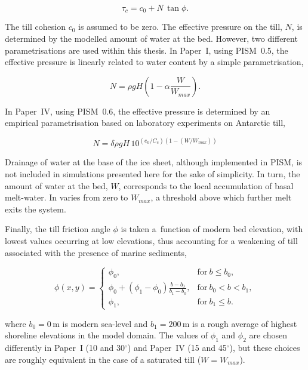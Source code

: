 \documentclass{article}
\begin{document}
\begin{equation}
   \tau_c = c_0 + N\,\tan{\phi}.
\end{equation}

The till cohesion $c_0$ is assumed to be zero. The effective pressure on the
till, $N$, is determined by the modelled amount of water at the bed. However,
two different parametrisations are used within this thesis. In Paper~I, using
PISM~0.5, the effective pressure is linearly related to water content by a
simple parametrisation,

\begin{equation}
    N = \rho gH (1 - \alpha \frac{W}{W_{max}}).
\end{equation}

In Paper~IV, using PISM~0.6, the effective pressure is determined by an
empirical parametrisation based on laboratory experiments on Antarctic till,

\begin{equation}
    N = \delta \rho gH \, 10^{(e_0/C_c) (1 - (W/W_{max}))}
\end{equation}

Drainage of water at the base of the ice sheet, although implemented in PISM,
is not included in simulations presented here for the sake of simplicity.
In turn, the amount of water at the bed, $W$, corresponds to the local
accumulation of basal melt-water. In varies from zero to $W_{max}$, a threshold
above which further melt exits the system.

Finally, the till friction angle $\phi$ is taken a~function of modern bed
elevation, with lowest values occurring at low elevations, thus accounting for
a weakening of till associated with the presence of marine sediments,

\begin{equation}
    \phi(x,y) =
    \begin{cases}
        \phi_0, & \mathrm{for}\ b \le b_0, \\
        \phi_0 + (\phi_1-\phi_0) \frac{b - b_0}{b_1-b_0},
            & \mathrm{for}\ b_0 < b < b_1, \\
        \phi_1, & \mathrm{for}\ b_1 \le b.
    \end{cases}
\end{equation}

where $b_0=0$\,m is modern sea-level and $b_1=200$\,m is a rough average of
highest shoreline elevations in the model domain. The values of $\phi_1$ and
$\phi_2$ are chosen differently in Paper~I (10 and 30$^\circ$) and Paper~IV
(15 and 45$^\circ$), but these choices are roughly equivalent in the case of a
saturated till ($W=W_{max}$).
\end{document}

